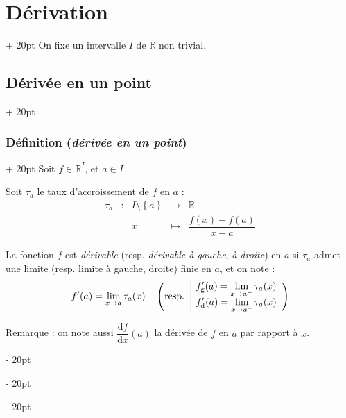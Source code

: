 \documentclass[a4paper, 12pt, twoside]{article}
\newcommand{\R}{\mathbb{R}} %
\newcommand{\lr}[1]{\left( #1 \right)}
\newcommand{\set}[1]{\left\{ #1 \right\}}
\newcommand{\ind}[1][20pt]{\advance\leftskip + #1}
\newcommand{\deind}[1][20pt]{\advance\leftskip - #1}
\newenvironment{indt}[2][20pt]{#2 \par \ind[#1]}{\par \deind} %
\begin{document}
    \begin{indt}{\section{Dérivation}}
        On fixe un intervalle $I$ de $\R$ non trivial.

        \begin{indt}{\subsection{Dérivée en un point}}
            \begin{indt}{\subsubsection{Définition (\textit{dérivée en un point})}}
                Soit $f \in \R^I$, et $a \in I$

                Soit $\tau_a$ le taux d'accroissement de $f$ en $a$ :
                \[
                    \begin{array}{rcccc}
                        \tau_a & : & I \setminus \set a & \longrightarrow & \R
                        \\
                        && x & \longmapsto & \dfrac{f(x) - f(a)}{x - a}
                    \end{array}
                \]

                \vspace{6pt}
                
                La fonction $f$ est \textit{dérivable} (resp. \textit{dérivable à gauche}, \textit{à droite}) en $a$ si $\tau_a$ admet une limite (resp. limite à gauche, droite) finie en $a$, et on note :
                \[
                    f'(a) = \lim_{x \to a} \tau_a(x)
                    \quad \lr{\text{resp.}\ \
                        \begin{array}{|l}
                            f_{\rm g}'(a) = \displaystyle \lim_{x \to a^-} \tau_a(x)
                            \\
                            f_{\rm d}'(a) = \displaystyle \lim_{x \to a^+} \tau_a(x)
                        \end{array}
                    }
                \]

                Remarque : on note aussi $\dfrac{\mathrm d f}{\mathrm dx}(a)$ la dérivée de $f$ en $a$ par rapport à $x$.
            \end{indt}


\end{indt}
\end{indt}
\end{document}
